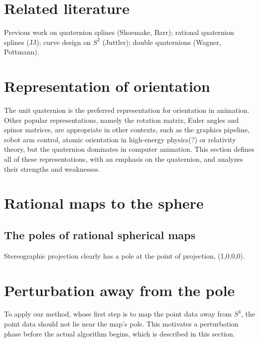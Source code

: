 \documentclass[12pt]{article}
\begin{document}
\section{Related literature}

Previous work on quaternion splines (Shoemake, Barr); rational quaternion splines (JJ);
curve design on $S^2$ (Juttler); double quaternions (Wagner, Pottmann).

\section{Representation of orientation}

The unit quaternion is the preferred representation for orientation in animation.
Other popular representations, namely the rotation matrix, Euler angles and 
spinor matrices, are appropriate in other contexts, such as the graphics pipeline, 
robot arm control, atomic orientation in high-energy physics(?) or relativity theory,
but the quaternion dominates in computer animation.
This section defines all of these representations, with an emphasis on the quaternion,
and analyzes their strengths and weaknesses.

\section{Rational maps to the sphere}

\subsection{The poles of rational spherical maps}

Stereographic projection clearly has a pole at the point of projection, (1,0,0,0).

\section{Perturbation away from the pole}

To apply our method, whose first step is to map the point data away from $S^3$, 
the point data should not lie near the map's pole.
This motivates a perturbation phase before the actual algorithm begins,
which is described in this section.
\end{document}
